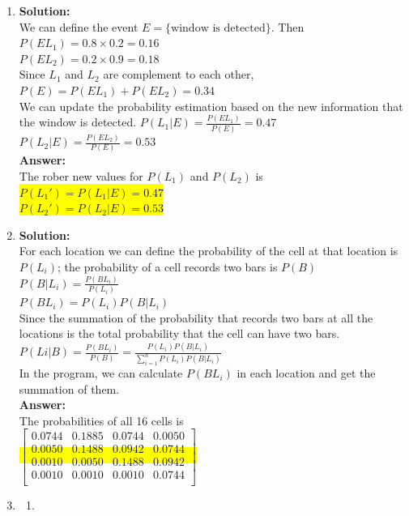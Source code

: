 \documentclass{article}
\newcommand{\myansw}{\textbf{Answer:}\\}
\newcommand{\mysolu}{\textbf{Solution:}\\}
\begin{document}
\begin{enumerate}
\begin{enumerate}
	\end{enumerate}
	\item
	\mysolu
	We can define the event ${E=\{\text{window is detected}\}}$. Then\\
	${P(EL_1)=0.8\times 0.2=0.16}$\\
	${P(EL_2)=0.2\times 0.9=0.18}$\\
	Since ${L_1}$ and ${L_2}$ are complement to each other,\\
	${P(E)=P(EL_1)+P(EL_2)=0.34}$\\
	We can update the probability estimation based on the new information that the window is detected.
	${P(L_1|E)=\frac{P(EL_1)}{P(E)}=0.47}$\\
	${P(L_2|E)=\frac{P(EL_2)}{P(E)}=0.53}$\\
	\myansw
	The rober new values for ${P(L_1)}$ and ${P(L_2)}$ is\\
	\colorbox{yellow}{
		${P(L_1')=P(L_1|E)=0.47}$
	}\\
	\colorbox{yellow}{
		${P(L_2')=P(L_2|E)=0.53}$
	}\\
	\item
	\mysolu
	For each location we can define the probability of the cell at that location is ${P(L_i)}$; the probability of a cell records two bars is ${P(B)}$\\
	${P(B|L_i)=\frac{P(BL_i)}{P(L_i)}}$\\
	${P(BL_i)=P(L_i)P(B|L_i)}$\\
	Since the summation of the probability that records two bars at all the locations is the total probability that the cell can have two bars.\\
	${P(Li|B)=\frac{P(BL_i)}{P(B)}=\frac{P(L_i)P(B|L_i)}{\sum\limits_{i=1}^n P(L_i)P(B|L_i)}}$\\
	In the program, we can calculate ${P(BL_i)}$ in each location and get the summation of them.\\
	\myansw
	The probabilities of all 16 cells is\\
	\colorbox{yellow}{
		$\begin{bmatrix}
			0.0744&0.1885&0.0744&0.0050\\
			0.0050&0.1488&0.0942&0.0744\\
			0.0010&0.0050&0.1488&0.0942\\
			0.0010&0.0010&0.0010&0.0744\\
		\end{bmatrix}$
	}
	\item
	\begin{enumerate}
		\item

\end{enumerate}
\end{enumerate}
\end{document}
